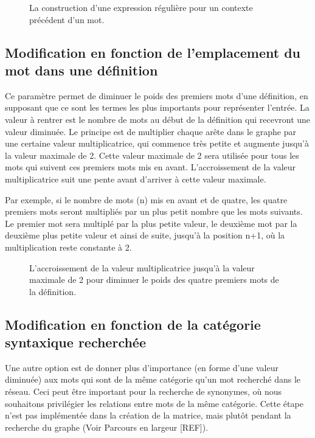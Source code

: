 \begin{figure}
\centering
\parbox{17cm}{
\def\svgscale{0.6}

\caption{La construction d'une expression régulière pour un contexte précédent d'un mot.}
\label{fig:regex}}
\end{figure}

\subsection{Modification en fonction de l'emplacement du mot dans une définition}
Ce paramètre permet de diminuer le poids des premiers mots d'une définition, en supposant que ce sont les termes les plus importants pour représenter l'entrée. La valeur à rentrer est le nombre de mots au début de la définition qui recevront une valeur diminuée. Le principe est de multiplier chaque arête dans le graphe par une certaine valeur multiplicatrice, qui commence très petite et augmente jusqu'à la valeur maximale de 2. Cette valeur maximale de 2 sera utilisée pour tous les mots qui suivent ces premiers mots mis en avant. L'accroissement de la valeur multiplicatrice suit une pente avant d'arriver à cette valeur maximale.

Par exemple, si le nombre de mots (n) mis en avant et de quatre, les quatre premiers mots seront multipliés par un plus petit nombre que les mots suivants. Le premier mot sera multiplé par la plus petite valeur, le deuxième mot par la deuxième plus petite valeur et ainsi de suite, jusqu'à la position n+1, où la multiplication reste constante à 2.


\begin{figure}
\centering
\parbox{5cm}{
\def\svgscale{1}

\caption{L'accroissement de la valeur multiplicatrice jusqu'à la valeur maximale de 2 pour diminuer le poids des quatre premiers mots de la définition.}
\label{fig:multiply}}
\end{figure}

\subsection{Modification en fonction de la catégorie syntaxique recherchée}
Une autre option est de donner plus d'importance (en forme d'une valeur diminuée) aux mots qui sont de la même catégorie qu'un mot recherché dans le réseau. Ceci peut être important pour la recherche de synonymes, où nous souhaitons privilégier les relations entre mots de la même catégorie. Cette étape n'est pas implémentée dans la création de la matrice, mais plutôt pendant la recherche du graphe (Voir Parcours en largeur [REF]).







